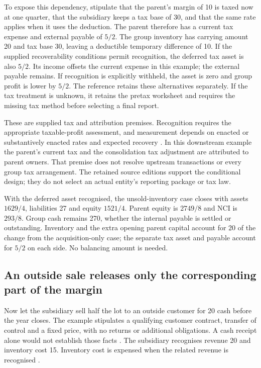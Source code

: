 To expose this dependency, stipulate that the parent's margin of 10 is taxed
now at one quarter, that the subsidiary keeps a tax base of 30, and that the
same rate applies when it uses the deduction. The parent therefore has a
current tax expense and external payable of $5/2$. The group inventory has
carrying amount 20 and tax base 30, leaving a deductible temporary difference
of 10. If the supplied recoverability conditions permit recognition, the
deferred tax asset is also $5/2$. Its income offsets the current expense in
this example; the external payable remains. If recognition is explicitly
withheld, the asset is zero and group profit is lower by $5/2$. The reference
retains these alternatives separately. If the tax treatment is unknown, it
retains the pretax worksheet and requires the missing tax method before
selecting a final report.

These are supplied tax and attribution premises. Recognition requires the
appropriate taxable-profit assessment, and measurement depends on enacted or
substantively enacted rates and expected recovery
\citep[paras.~24--29, 46--51 and 58]{aasb112dated}. In this downstream example
the parent's current tax and the consolidation tax adjustment are attributed
to parent owners. That premise does not resolve upstream transactions or
every group tax arrangement. The retained source editions support the
conditional design; they do not select an actual entity's reporting package
or tax law.

With the deferred asset recognised, the unsold-inventory case closes with
assets $1629/4$, liabilities 27 and equity $1521/4$. Parent equity is $2749/8$
and NCI is $293/8$. Group cash remains 270, whether the internal payable is
settled or outstanding. Inventory and the extra opening parent capital account
for 20 of the change from the acquisition-only case; the separate tax asset
and payable account for $5/2$ on each side. No balancing amount is needed.

\subsection{An outside sale releases only the corresponding part of the margin}

Now let the subsidiary sell half the lot to an outside customer for 20 cash
before the year closes. The example stipulates a qualifying customer contract,
transfer of control and a fixed price, with no returns or additional obligations.
A cash receipt alone would not establish those facts
\citep[paras.~9, 31--38 and 47]{aasb15dated}. The subsidiary recognises revenue
20 and inventory cost 15. Inventory cost is expensed when the related revenue
is recognised \citep[para.~34]{aasb102compiled2021}.


